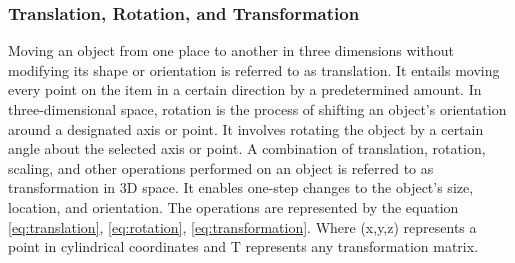 \subsubsection{Translation, Rotation, and Transformation}
Moving an object from one place to another in three dimensions without modifying its shape or orientation is referred to as translation. It entails moving every point on the item in a certain direction by a predetermined amount. In three-dimensional space, rotation is the process of shifting an object's orientation around a designated axis or point. It involves rotating the object by a certain angle about the selected axis or point. A combination of translation, rotation, scaling, and other operations performed on an object is referred to as transformation in 3D space. It enables one-step changes to the object's size, location, and orientation. The operations are represented by the equation \ref{eq:translation}, \ref{eq:rotation}, \ref{eq:transformation}. Where (x,y,z) represents a point in cylindrical coordinates and T represents any transformation matrix.

